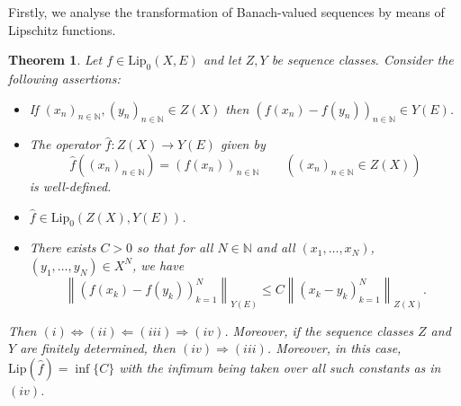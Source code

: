 \documentclass[10pt,a4paper]{amsart}
\newtheorem{theorem}{Theorem}[section]
\def\N{\mathbb{N}}
\def\Lip{\mathrm{Lip}_0}
\def\Lipnorm{\mathrm{Lip}}
\begin{document}
Firstly, we analyse the transformation of Banach-valued sequences by means of Lipschitz functions.


\begin{theorem}\label{Th 1}
	Let $f\in \Lip(X,E)$ and let $Z,Y$ be sequence classes. Consider the following assertions:
	\begin{itemize}
		\item[$(i)$] If $(x_n)_{n\in\N},(y_n)_{n\in\N}\in Z(X)$ then $(f(x_n)-f(y_n))_{n\in\N}\in Y(E)$.
		\item[$(ii)$] The operator $\hat{f}: Z(X)\to Y(E)$ given by
		$$
		\hat{f}((x_n)_{n\in\N}) = (f(x_n))_{n\in\N} \qquad ((x_n)_{n\in\N} \in Z(X))
		$$
		is well-defined.
		\item[$(iii)$] $\hat{f} \in \Lip(Z(X),Y(E))$.
		\item[$(iv)$] There exists $C>0$ so that for all $N\in \N$ and all $(x_1,\ldots,x_N)$, $(y_1,\ldots,y_N)\in X^N$, we have
		$$
		\left\|(f(x_k)-f(y_k))_{k=1}^N\right\|_{Y(E)} \leq C\left\|(x_k-y_k)_{k=1}^N\right\|_{Z(X)}.
		$$
	\end{itemize}
	Then $(i) \Leftrightarrow (ii) \Leftarrow (iii) \Rightarrow (iv)$.  Moreover, if the sequence classes $Z$ and $Y$ are finitely determined, then $(iv) \Rightarrow (iii)$. Moreover, in this case, $\Lipnorm(\hat{f}) = \inf\{C\}$ with the infimum being taken over all such constants as in $(iv)$.
\end{theorem}
\end{document}
